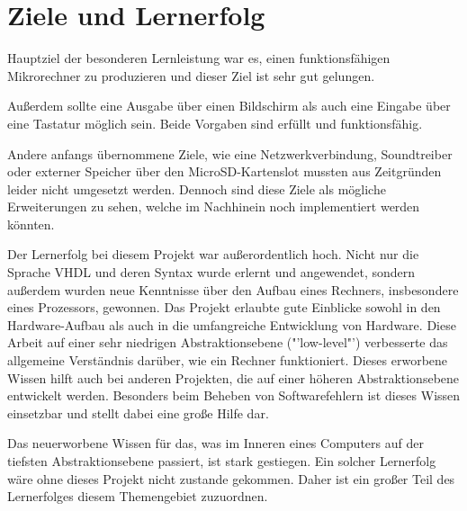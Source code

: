 \section{Ziele und Lernerfolg}
Hauptziel der besonderen Lernleistung war es, einen funktionsfähigen
Mikrorechner zu produzieren und dieser Ziel ist sehr gut gelungen.

Außerdem sollte eine Ausgabe über einen Bildschirm als auch eine Eingabe über
eine Tastatur möglich sein. Beide Vorgaben sind erfüllt und funktionsfähig.

Andere anfangs übernommene Ziele, wie eine Netzwerkverbindung, Soundtreiber oder
externer Speicher über den MicroSD-Kartenslot mussten aus Zeitgründen leider
nicht umgesetzt werden. Dennoch sind diese Ziele als mögliche Erweiterungen zu
sehen, welche im Nachhinein noch implementiert werden könnten.

Der Lernerfolg bei diesem Projekt war außerordentlich hoch. Nicht nur die
Sprache VHDL und deren Syntax wurde erlernt und angewendet, sondern außerdem
wurden neue Kenntnisse über den Aufbau eines Rechners, insbesondere eines
Prozessors, gewonnen. Das Projekt erlaubte gute Einblicke sowohl in den
Hardware-Aufbau als auch in die umfangreiche Entwicklung von Hardware. Diese
Arbeit auf einer sehr niedrigen Abstraktionsebene ("'low-level"') verbesserte das
allgemeine Verständnis darüber, wie ein Rechner funktioniert. Dieses erworbene
Wissen hilft auch bei anderen Projekten, die auf einer höheren Abstraktionsebene
entwickelt werden. Besonders beim Beheben von Softwarefehlern ist dieses Wissen
einsetzbar und stellt dabei eine große Hilfe dar.

Das neuerworbene Wissen für das, was im Inneren eines Computers auf der tiefsten
Abstraktionsebene passiert, ist stark gestiegen. Ein solcher Lernerfolg wäre
ohne dieses Projekt nicht zustande gekommen. Daher ist ein großer Teil des
Lernerfolges diesem Themengebiet zuzuordnen.

\pagebreak
